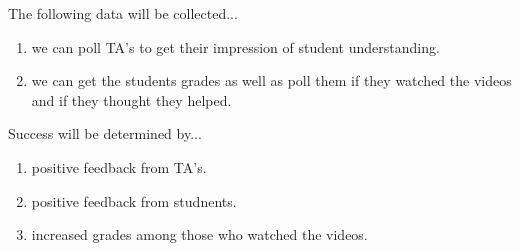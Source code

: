 \documentclass{article}
\begin{document}
The following data will be collected...

\begin{enumerate}
\item we can poll TA's to get their impression of student understanding. 
\item we can get the students grades as well as poll them if they watched the videos and if they thought they helped. 
\end{enumerate}

Success will be determined by...

\begin{enumerate}
\item positive feedback from TA's.
\item positive feedback from studnents.
\item increased grades among those who watched the videos.
\end{enumerate}
\end{document}
